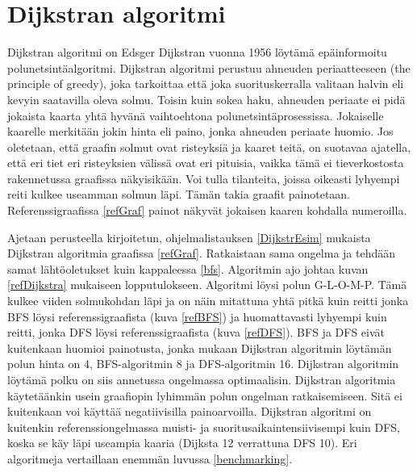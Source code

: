 \section{Dijkstran algoritmi}\label{dijkstra}
Dijkstran algoritmi on Edsger Dijkstran vuonna 1956 löytämä epäinformoitu 
polunetsintäalgoritmi.\cite{applSciLawande} Dijkstran algoritmi perustuu 
ahneuden periaatteeseen (the principle of greedy), joka tarkoittaa että joka 
suorituskerralla valitaan halvin eli kevyin saatavilla oleva 
solmu.\cite{mazeGameTrilogi} Toisin kuin sokea haku, ahneuden periaate ei pidä 
jokaista kaarta yhtä hyvänä vaihtoehtona polunetsintäprosessissa. Jokaiselle 
kaarelle merkitään jokin hinta eli paino, jonka ahneuden periaate huomio. Jos 
oletetaan, että graafin solmut ovat risteyksiä ja kaaret teitä, on suotavaa 
ajatella, että eri tiet eri risteyksien välissä ovat eri pituisia, vaikka tämä 
ei tieverkostosta rakennetussa graafissa näkyisikään. Voi tulla tilanteita, 
joissa oikeasti lyhyempi reiti kulkee useamman solmun läpi. Tämän takia 
graafit painotetaan. Referenssigraafissa \ref{refGraf} painot näkyvät jokaisen 
kaaren kohdalla numeroilla. \par
	Ajetaan \textcite{applSciLawande} perusteella kirjoitetun, 
ohjelmalistauksen \ref{DijkstrEsim} mukaista Dijkstran algoritmia graafissa 
\ref{refGraf}. Ratkaistaan sama ongelma ja tehdään samat lähtöoletukset kuin 
kappaleessa \ref{bfs}. Algoritmin ajo johtaa kuvan \ref{refDijkstra} mukaiseen 
lopputulokseen. Algoritmi löysi polun G-L-O-M-P. Tämä kulkee viiden 
solmukohdan läpi ja on näin mitattuna yhtä pitkä kuin reitti jonka BFS löysi 
referenssigraafista (kuva \ref{refBFS}) ja huomattavasti lyhyempi kuin 
reitti, jonka DFS löysi referenssigraafista (kuva \ref{refDFS}). BFS ja DFS 
eivät kuitenkaan huomioi painotusta, jonka mukaan Dijkstran algoritmin 
löytämän polun hinta on 4, BFS-algoritmin 8 ja DFS-algoritmin 16. Dijkstran 
algoritmin löytämä polku on siis annetussa ongelmassa optimaalisin. Dijkstran 
algoritmia käytetäänkin usein graafiopin lyhimmän polun ongelman 
ratkaisemiseen.\cite{IOPDijkstra} Sitä ei kuitenkaan voi käyttää 
negatiivisilla painoarvoilla.\cite{applSciLawande} Dijkstran algoritmi on 
kuitenkin referenssiongelmassa muisti- ja suoritusaikaintensiivisempi kuin 
DFS, koska se käy läpi useampia kaaria (Dijksta 12 verrattuna DFS 10). Eri 
algoritmeja vertaillaan enemmän luvussa \ref{benchmarking}.

